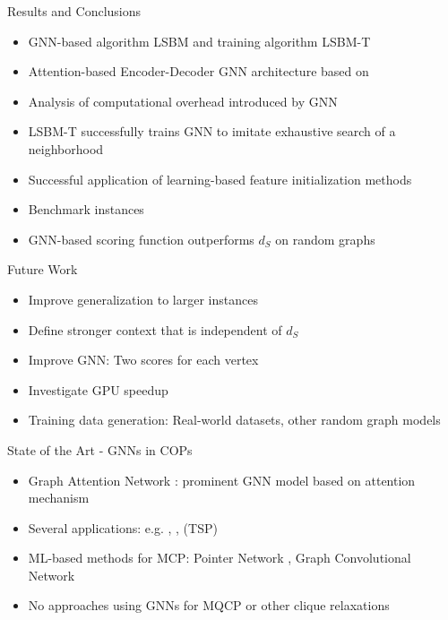 \documentclass{beamer}
\newcommand{\backupbegin}{
   \newcounter{finalframe}
   \setcounter{finalframe}{\value{framenumber}}
}
\begin{document}
\begin{frame}{Results and Conclusions}
    \begin{itemize}
        \item<1-> GNN-based algorithm LSBM and training algorithm LSBM-T
        \item<2-> Attention-based Encoder-Decoder GNN architecture based on \cite{Kool2019}
        \item<3-> Analysis of computational overhead introduced by GNN
        \item<4-> LSBM-T successfully trains GNN to imitate exhaustive search of a neighborhood
        \item<5-> Successful application of learning-based feature initialization methods
        \item<6-> Benchmark instances
        \item<7-> GNN-based scoring function outperforms $d_S$ on random graphs
    \end{itemize}
\end{frame}

\begin{frame}{Future Work}
    \begin{itemize}
        \item<1-> Improve generalization to larger instances
        \item<2-> Define stronger context that is independent of $d_S$
        \item<3-> Improve GNN: Two scores for each vertex
        \item<4-> Investigate GPU speedup
        \item<5-> Training data generation: Real-world datasets, other random graph models
    \end{itemize}
\end{frame}

\backupbegin

 


\begin{frame}{State of the Art - GNNs in COPs}
    \begin{itemize}
        \item<1-> Graph Attention Network \cite{Velickovic2018}: prominent GNN model based on attention mechanism \cite{Bahdanau2015}
        \item<2-> Several applications: e.g. \cite{Kool2019}, \cite{Joshi2021}, \cite{Hudson2021} (TSP)
        \item<4-> ML-based methods for MCP: Pointer Network \cite{Gu2020}, Graph Convolutional Network \cite{Li2018}
        \item<5-> No approaches using GNNs for MQCP or other clique relaxations
    \end{itemize}
\end{frame}
\end{document}
